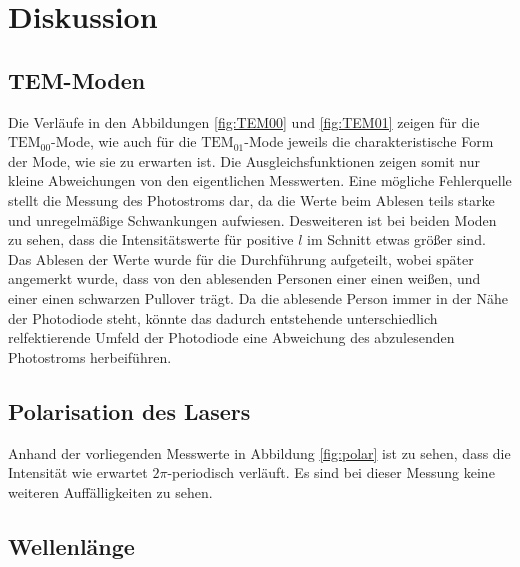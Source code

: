 \section{Diskussion}
\label{sec:Diskussion}

\subsection{TEM-Moden}

Die Verläufe in den Abbildungen \ref{fig:TEM00} und \ref{fig:TEM01} zeigen für die $\text{TEM}_{00}$-Mode, wie auch für die $\text{TEM}_{01}$-Mode jeweils
die charakteristische Form der Mode, wie sie zu erwarten ist. Die Ausgleichsfunktionen zeigen somit nur kleine Abweichungen von den 
eigentlichen Messwerten. Eine mögliche Fehlerquelle stellt die Messung des Photostroms dar, da die Werte beim Ablesen teils starke und 
unregelmäßige Schwankungen aufwiesen. Desweiteren ist bei beiden Moden zu sehen, dass die Intensitätswerte für positive $l$ im Schnitt etwas 
größer sind. Das Ablesen der Werte wurde für die Durchführung aufgeteilt, wobei später angemerkt wurde, dass von den ablesenden Personen 
einer einen weißen, und einer einen schwarzen Pullover trägt. Da die ablesende Person immer in der Nähe der Photodiode steht, könnte das dadurch
entstehende unterschiedlich relfektierende Umfeld der Photodiode eine Abweichung des abzulesenden Photostroms herbeiführen. 

\subsection{Polarisation des Lasers}

Anhand der vorliegenden Messwerte in Abbildung \ref{fig:polar} ist zu sehen, dass die Intensität wie erwartet $2\pi$-periodisch verläuft. Es sind bei dieser 
Messung keine weiteren Auffälligkeiten zu sehen. 

\subsection{Wellenlänge}

